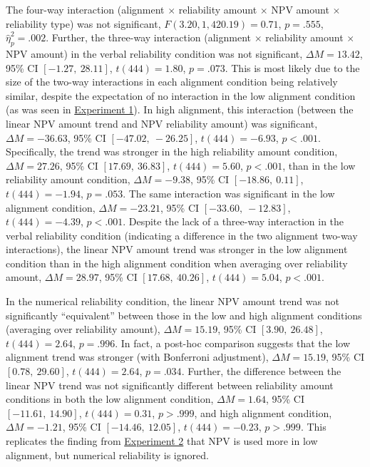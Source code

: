 \documentclass[a4paper, nobind, dvipsnames]{templates/ociamthesis}
\theoremstyle{definition}
\theoremstyle{definition}
\theoremstyle{definition}
\theoremstyle{definition}
\theoremstyle{remark}
\begin{document}
The four-way interaction (alignment \(\times\) reliability amount \(\times\) NPV
amount \(\times\) reliability type) was not significant,
\(F(3.20, 1,420.19) = 0.71\), \(p = .555\), \(\hat{\eta}^2_p = .002\). Further, the three-way interaction
(alignment \(\times\) reliability amount \(\times\) NPV amount) in the verbal
reliability condition was not significant,
\(\Delta M = 13.42\), 95\% CI \([-1.27,~28.11]\), \(t(444) = 1.80\), \(p = .073\). This is
most likely due to the size of the two-way interactions in each alignment
condition being relatively similar, despite the expectation of no interaction in
the low alignment condition (as was seen in \protect\hyperlink{results-alignment-2}{Experiment
1}). In high alignment, this interaction (between the
linear NPV amount trend and NPV reliability amount) was significant,
\(\Delta M = -36.63\), 95\% CI \([-47.02,~-26.25]\), \(t(444) = -6.93\), \(p < .001\).
Specifically, the trend was stronger in the high reliability amount condition,
\(\Delta M = 27.26\), 95\% CI \([17.69,~36.83]\), \(t(444) = 5.60\), \(p < .001\),
than in the low reliability amount condition,
\(\Delta M = -9.38\), 95\% CI \([-18.86,~0.11]\), \(t(444) = -1.94\), \(p = .053\).
The same interaction was significant in the low alignment condition,
\(\Delta M = -23.21\), 95\% CI \([-33.60,~-12.83]\), \(t(444) = -4.39\), \(p < .001\).
Despite the lack of a three-way interaction in the verbal reliability condition
(indicating a difference in the two alignment two-way interactions), the linear
NPV amount trend was stronger in the low alignment condition than in the high
alignment condition when averaging over reliability amount,
\(\Delta M = 28.97\), 95\% CI \([17.68,~40.26]\), \(t(444) = 5.04\), \(p < .001\).

In the numerical reliability condition, the linear NPV amount trend was not
significantly ``equivalent'' between those in the low and high alignment
conditions (averaging over reliability amount),
\(\Delta M = 15.19\), 95\% CI \([3.90,~26.48]\), \(t(444) = 2.64\), \(p = .996\). In
fact, a post-hoc comparison suggests that the low alignment trend was stronger
(with Bonferroni adjustment),
\(\Delta M = 15.19\), 95\% CI \([0.78,~29.60]\), \(t(444) = 2.64\), \(p = .034\). Further,
the difference between the linear NPV trend was not significantly different
between reliability amount conditions in both the low alignment condition,
\(\Delta M = 1.64\), 95\% CI \([-11.61,~14.90]\), \(t(444) = 0.31\), \(p > .999\),
and high alignment condition,
\(\Delta M = -1.21\), 95\% CI \([-14.46,~12.05]\), \(t(444) = -0.23\), \(p > .999\).
This replicates the finding from \href{results-alignment-3}{Experiment 2} that NPV is
used more in low alignment, but numerical reliability is ignored.
\end{document}

